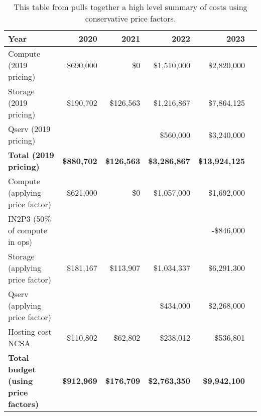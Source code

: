 \tiny \begin{longtable} { |p{}  |r  |r  |r  |r  |r |}
\caption{ This table from  pulls together a high level summary of costs using conservative price factors.
 \label{tab:Summary}}\\
\hline
\textbf{Year}&\textbf{2020}&\textbf{2021}&\textbf{2022}&\textbf{2023} \\ \hline
{Compute (2019 pricing)}&{\$690,000}&{\$0}&{\$1,510,000}&{\$2,820,000} \\ \hline
{Storage (2019 pricing)}&{\$190,702}&{\$126,563}&{\$1,216,867}&{\$7,864,125} \\ \hline
{Qserv (2019 pricing)}&{}&{}&{\$560,000}&{\$3,240,000} \\ \hline
\textbf{Total (2019 pricing)}&\textbf{\$880,702}&\textbf{\$126,563}&\textbf{\$3,286,867}&\textbf{\$13,924,125} \\ \hline
{Compute (applying price factor)}&{\$621,000}&{\$0}&{\$1,057,000}&{\$1,692,000} \\ \hline
{IN2P3 (50\% of compute in ops)}&{}&{}&{}&{-\$846,000} \\ \hline
{Storage (applying price factor)}&{\$181,167}&{\$113,907}&{\$1,034,337}&{\$6,291,300} \\ \hline
{Qserv (applying price factor)}&{}&{}&{\$434,000}&{\$2,268,000} \\ \hline
{Hosting cost NCSA
}&{\$110,802}&{\$62,802}&{\$238,012}&{\$536,801} \\ \hline
\textbf{Total budget (using price factors)}&\textbf{\$912,969}&\textbf{\$176,709}&\textbf{\$2,763,350}&\textbf{\$9,942,100} \\ \hline
\end{longtable} \normalsize
